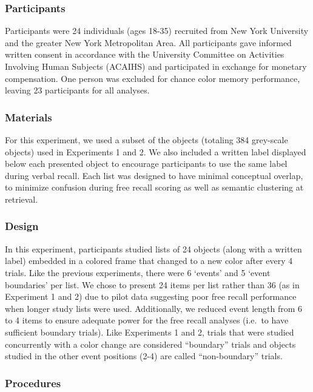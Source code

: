 \subsubsection{Participants}\label{participants-2}

Participants were 24 individuals (ages 18-35) recruited from New York
University and the greater New York Metropolitan Area. All participants
gave informed written consent in accordance with the University
Committee on Activities Involving Human Subjects (ACAIHS) and
participated in exchange for monetary compensation. One person was
excluded for chance color memory performance, leaving 23 participants
for all analyses.

\subsubsection{Materials}\label{materials-2}

For this experiment, we used a subset of the objects (totaling 384
grey-scale objects) used in Experiments 1 and 2. We also included a
written label displayed below each presented object to encourage
participants to use the same label during verbal recall. Each list was
designed to have minimal conceptual overlap, to minimize confusion
during free recall scoring as well as semantic clustering at retrieval.

\subsubsection{Design}\label{design}

In this experiment, participants studied lists of 24 objects (along with
a written label) embedded in a colored frame that changed to a new color
after every 4 trials. Like the previous experiments, there were 6
`events' and 5 `event boundaries' per list. We chose to present 24 items
per list rather than 36 (as in Experiment 1 and 2) due to pilot data
suggesting poor free recall performance when longer study lists were
used. Additionally, we reduced event length from 6 to 4 items to ensure
adequate power for the free recall analyses (i.e.~to have sufficient
boundary trials). Like Experiments 1 and 2, trials that were studied
concurrently with a color change are considered ``boundary'' trials and
objects studied in the other event positions (2-4) are called
``non-boundary'' trials.

\subsubsection{Procedures}\label{procedures}

